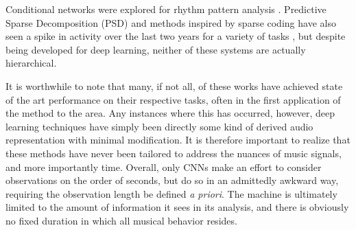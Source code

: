 Conditional networks were explored for rhythm pattern analysis \cite{Battenberg2012}.
Predictive Sparse Decomposition (PSD) and methods inspired by sparse coding have also seen a spike in activity over the last two years for a variety of tasks \cite{Henaff2011, Nam2012}, but despite being developed for deep learning, neither of these systems are actually hierarchical.


It is worthwhile to note that many, if not all, of these works have achieved state of the art performance on their respective tasks, often in the first application of the method to the area.
Any instances where this has occurred, however, deep learning techniques have simply been directly some kind of derived audio representation with minimal modification.
It is therefore important to realize that these methods have never been tailored to address the nuances of music signals, and more importantly time.
Overall, only CNNs make an effort to consider observations on the order of seconds, but do so in an admittedly awkward way, requiring the observation length be defined \emph{a priori}.
The machine is ultimately limited to the amount of information it sees in its analysis, and there is obviously no fixed duration in which all musical behavior resides.



